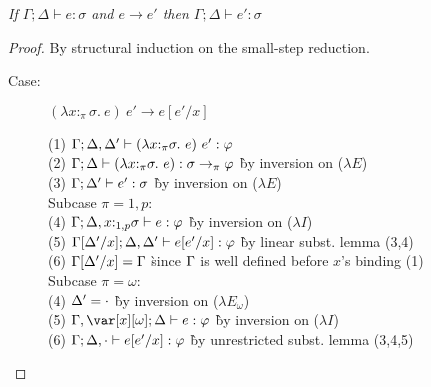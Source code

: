 
\begin{theorem}
\emph{If $\Gamma; \Delta \vdash e : \sigma$ and $e \longrightarrow e'$ then $\Gamma; \Delta \vdash e' : \sigma$}
\end{theorem}

\begin{proof}
By structural induction on the small-step reduction.

%

\begin{description}

\item[Case:] $(\lambda x{:}_\pi\sigma.~e)~e' \longrightarrow e[e'/x]$
\begin{tabbing}
    (1) $\Gamma; \Delta, \Delta' \vdash (\lambda x{:}_\pi\sigma.~e)~e' : \varphi$\\
    (2) $\Gamma; \Delta \vdash (\lambda x{:}_\pi\sigma.~e) : \sigma\to_\pi\varphi$ \` by inversion on ($\lambda E$) \\
    (3) $\Gamma; \Delta' \vdash e' : \sigma$ \` by inversion on ($\lambda E$) \\
    Subcase $\pi = 1,p$:\\
    (4) $\Gamma; \Delta,x{:}_{1,p}\sigma \vdash e : \varphi$ \` by inversion on ($\lambda I$) \\
    (5) $\Gamma[\Delta'/x]; \Delta, \Delta' \vdash e[e'/x] : \varphi$ \` by linear subst. lemma (3,4) \\
    (6) $\Gamma[\Delta'/x] = \Gamma$ \` since $\Gamma$ is well defined before $x$'s binding (1)\\
    Subcase $\pi = \omega$:\\
    (4) $\Delta' = \cdot$ \` by inversion on ($\lambda E_\omega$) \\
    (5) $\G, \xo; \D \vdash e : \vp$ \` by inversion on ($\lambda I$)\\
    (6) $\Gamma; \Delta, \cdot \vdash e[e'/x] : \varphi$ \` by unrestricted subst. lemma (3,4,5)\\
\end{tabbing}


\end{description}
\end{proof}

